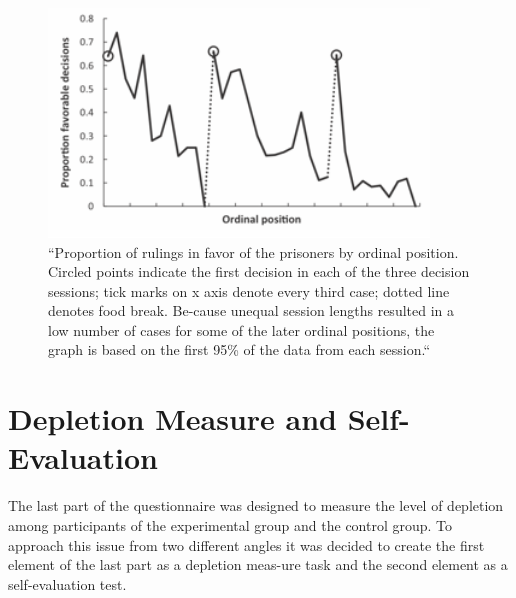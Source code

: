 \begin{figure}[h!]
\center
	\includegraphics[width=0.9\textwidth]{images/JD_decisions_danziger.png}
  \caption{“Proportion of rulings in favor of the prisoners by ordinal position. Circled points indicate the first decision in each of the three decision sessions; tick marks on x axis denote every third case; dotted line denotes food break. Be-cause unequal session lengths resulted in a low number of cases for some of the later ordinal positions, the graph is based on the first 95\% of the data from each session.“ \citep{danziger2011extraneous}}\label{fig:decisions_danziger}
\end{figure}

\section{Depletion Measure and Self-Evaluation}
The last part of the questionnaire was designed to measure the level of depletion among participants of the experimental group and the control group. To approach this issue from two different angles it was decided to create the first element of the last part as a depletion meas-ure task and the second element as a self-evaluation test.
